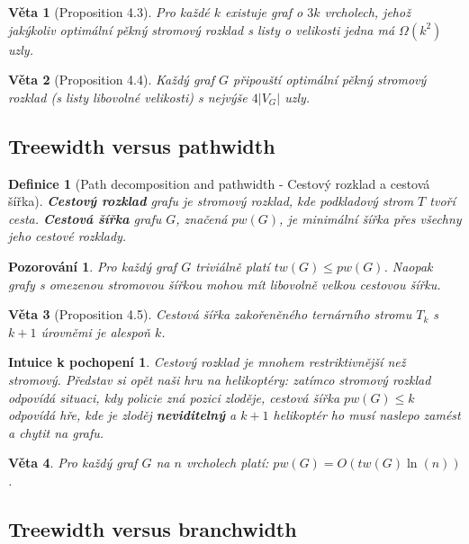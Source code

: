 \documentclass[a4paper,11pt]{article}
\newtheorem{definition}{Definice}[section]
\newtheorem{theorem}{Věta}[section]
\newtheorem{observation}{Pozorování}[section]
\newtheorem*{intuition}{Intuice k pochopení}
\begin{document}
\begin{theorem}[Proposition 4.3]
Pro každé $k$ existuje graf o $3k$ vrcholech, jehož jakýkoliv optimální pěkný stromový rozklad s listy o velikosti jedna má $\Omega(k^2)$ uzly.
\end{theorem}

\begin{theorem}[Proposition 4.4]
Každý graf $G$ připouští optimální pěkný stromový rozklad (s listy libovolné velikosti) s nejvýše $4|V_G|$ uzly.
\end{theorem}

\subsection{Treewidth versus pathwidth}

\begin{definition}[Path decomposition and pathwidth - Cestový rozklad a cestová šířka]
\textbf{Cestový rozklad} grafu je stromový rozklad, kde podkladový strom $T$ tvoří cesta. \textbf{Cestová šířka} grafu $G$, značená $pw(G)$, je minimální šířka přes všechny jeho cestové rozklady.
\end{definition}

\begin{observation}
Pro každý graf $G$ triviálně platí $tw(G) \le pw(G)$. Naopak grafy s omezenou stromovou šířkou mohou mít libovolně velkou cestovou šířku.
\end{observation}

\begin{theorem}[Proposition 4.5]
Cestová šířka zakořeněného ternárního stromu $T_k$ s $k+1$ úrovněmi je alespoň $k$.
\end{theorem}

\begin{intuition}
Cestový rozklad je mnohem restriktivnější než stromový. Představ si opět naši hru na helikoptéry: zatímco stromový rozklad odpovídá situaci, kdy policie zná pozici zloděje, cestová šířka $pw(G) \le k$ odpovídá hře, kde je zloděj \textbf{neviditelný} a $k+1$ helikoptér ho musí naslepo zamést a chytit na grafu.
\end{intuition}

\begin{theorem}
Pro každý graf $G$ na $n$ vrcholech platí: $pw(G) = O(tw(G) \ln(n))$.
\end{theorem}

\subsection{Treewidth versus branchwidth}
\end{document}
